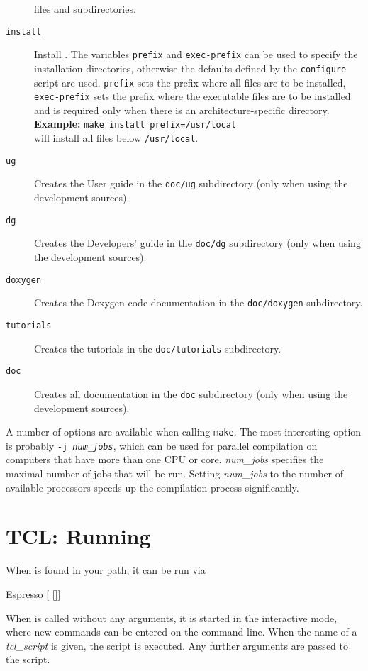 \begin{description}
  files and subdirectories.
\item[\texttt{install}] Install \es. The variables \texttt{prefix} and
  \texttt{exec-prefix} can be used to specify the installation
  directories, otherwise the defaults defined by the
  \texttt{configure} script are used. \texttt{prefix} sets the prefix
  where all \es files are to be installed, \texttt{exec-prefix} sets
  the prefix where the executable files are to be installed and is
  required only when there is an architecture-specific directory.\\
  \textbf{Example:} \verb!make install prefix=/usr/local!\\
  will install all files below \texttt{/usr/local}.
\item[\texttt{ug\ \ }] Creates the User guide in the \texttt{doc/ug}
  subdirectory (only when using the development sources).
\item[\texttt{dg\ \ }] Creates the Developers' guide in the
  \texttt{doc/dg} subdirectory (only when using the development
  sources).
\item[\texttt{doxygen\ \ }] Creates the Doxygen code documentation in the
  \texttt{doc/doxygen} subdirectory.
\item[\texttt{tutorials\ \ }] Creates the \es tutorials in the
  \texttt{doc/tutorials} subdirectory.
\item[\texttt{doc\ }] Creates all documentation in the \texttt{doc}
  subdirectory (only when using the development sources).
\end{description}

A number of options are available when calling \texttt{make}.  The
most interesting option is probably \texttt{-j \textit{num\_jobs}},
which can be used for parallel compilation on computers that have more
than one CPU or core.  \textit{num\_jobs} specifies the maximal number
of jobs that will be run.  Setting \textit{num\_jobs} to the number of
available processors speeds up the compilation process significantly.

\section{TCL: Running \es}
\label{sec:run}

When \es is found in your path, it can be run via
\begin{code}
Espresso [ []]
\end{code}

 When \es{} is called without any arguments,
it is started in the interactive mode, where new commands can be
entered on the command line. When the name of a \textit{tcl\_script}
is given, the script is executed. Any further arguments are passed to
the script.

